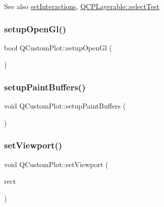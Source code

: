 \begin{DoxySeeAlso}{See also}
\mbox{\hyperlink{class_q_custom_plot_a5ee1e2f6ae27419deca53e75907c27e5}{set\+Interactions}}, \mbox{\hyperlink{class_q_c_p_layerable_a04db8351fefd44cfdb77958e75c6288e}{Q\+C\+P\+Layerable\+::select\+Test}} 
\end{DoxySeeAlso}
\mbox{\label{class_q_custom_plot_a8954c4667c51070ff4e9b02d858fd190}} 
\subsubsection{\texorpdfstring{setupOpenGl()}{setupOpenGl()}}
{\footnotesize\ttfamily bool Q\+Custom\+Plot\+::setup\+Open\+Gl (\begin{DoxyParamCaption}{ }\end{DoxyParamCaption})\hspace{0.3cm}{\ttfamily [protected]}}

\mbox{\label{class_q_custom_plot_a2685341f7242c3882f4cc5e379308d71}} 
\subsubsection{\texorpdfstring{setupPaintBuffers()}{setupPaintBuffers()}}
{\footnotesize\ttfamily void Q\+Custom\+Plot\+::setup\+Paint\+Buffers (\begin{DoxyParamCaption}{ }\end{DoxyParamCaption})\hspace{0.3cm}{\ttfamily [protected]}}

\mbox{\label{class_q_custom_plot_a3f9bc4b939dd8aaba9339fd09f273fc4}} 
\subsubsection{\texorpdfstring{setViewport()}{setViewport()}}
{\footnotesize\ttfamily void Q\+Custom\+Plot\+::set\+Viewport (\begin{DoxyParamCaption}\item[{const Q\+Rect \&}]{rect }\end{DoxyParamCaption})}

